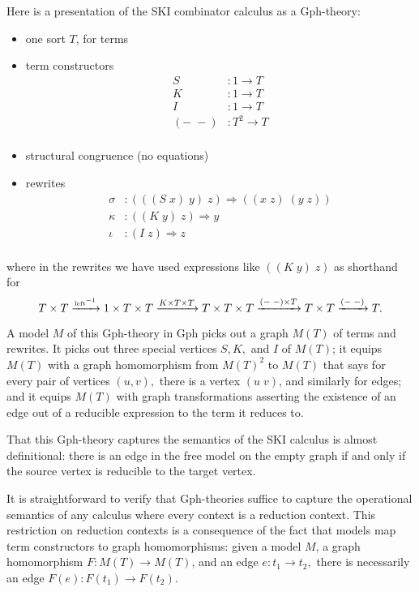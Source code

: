 \documentclass[a4paper,UKenglish]{lipics-v2016}
\newcommand{\maps}{\colon}
\begin{document}
Here is a presentation of the SKI combinator calculus as a Gph-theory:
\begin{itemize}
  \item one sort $T$, for terms
  \item term constructors
  \[\begin{array}{rl}
    S&:1 \to T\\
    K&:1 \to T\\
    I&:1 \to T\\
    (-\; -)&: T^2 \to T\\
  \end{array}\]
  \item structural congruence (no equations)
  \item rewrites
  \[\begin{array}{rl}
    \sigma&:(((S\; x)\; y)\; z) \Rightarrow ((x\; z)\; (y\; z))\\
    \kappa&:((K\; y)\; z) \Rightarrow y\\
    \iota&:(I\; z) \Rightarrow z\\
  \end{array}\]
\end{itemize}
where in the rewrites we have used expressions like $((K\; y)\; z)$ as shorthand for
\[ T\times T \xrightarrow{\mbox{\tiny left}^{-1}} 1\times T \times T \xrightarrow{K \times T \times T} T\times T \times T \xrightarrow{(-\;-)\times T} T\times T \xrightarrow{(-\;-)} T. \]

A model $M$ of this Gph-theory in Gph picks out a graph $M(T)$ of terms and rewrites.  It picks out three special vertices $S,K,$ and $I$ of $M(T)$; it equips $M(T)$ with a graph homomorphism from $M(T)^2$ to $M(T)$ that says for every pair of vertices $(u,v),$ there is a vertex $(u\;v)$, and similarly for edges; and it equips $M(T)$ with graph transformations asserting the existence of an edge out of a reducible expression to the term it reduces to.

That this Gph-theory captures the semantics of the SKI calculus is almost definitional: there is an edge in the free model on the empty graph if and only if the source vertex is reducible to the target vertex.  

It is straightforward to verify that Gph-theories suffice to capture the operational semantics of any calculus where every context is a reduction context.  This restriction on reduction contexts is a consequence of the fact that models map term constructors to graph homomorphisms: given a model $M$, a graph homomorphism $F\maps M(T) \to M(T)$, and an edge $e\maps t_1 \to t_2,$ there is necessarily an edge $F(e)\maps F(t_1) \to F(t_2).$
\end{document}
